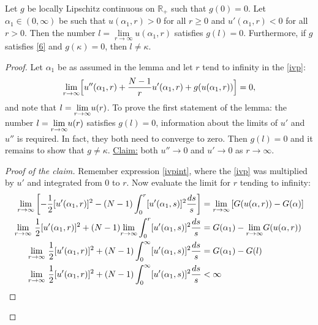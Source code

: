 \begin{lemma}\label{llemma}
Let $g$ be locally Lipschitz continuous on $\mathbb{R_+}$ such that $g(0)=0$. Let $\alpha_1\in(0,\infty)$ be such that $u(\alpha_1,r)>0$ for all $r\geq0$ and $u'(\alpha_1,r)<0$ for all $r>0$. Then the number $l=\underset{r\to\infty}{\lim}u(\alpha_1,r)$ satisfies $g(l)=0$. Furthermore, if $g$ satisfies \eqref{6} and $g(\kappa)=0$, then $l\neq\kappa$.
\end{lemma}
\begin{proof}
Let $\alpha_1$ be as assumed in the lemma and let $r$ tend to infinity in the \eqref{ivp}:
\begin{equation}\label{ivplim}\underset{r\to\infty}{\lim}\Big[u''(\alpha_1,r)+\frac{N-1}{r}u'(\alpha_1,r)+g(u(\alpha_1,r))\Big]=0,\end{equation} and note that $l=\underset{r\to\infty}{\lim} u(r)$. To prove the first statement of the lemma: the number $l=\underset{r\to\infty}{\lim} u(r)$ satisfies $g(l)=0$, information about the limits of $u'$ and $u''$ is required. In fact, they both need to converge to zero. Then $g(l)=0$ and it remains to show that $g\neq\kappa$. \underline{Claim:} both $u''\to0$ and $u'\to0$ as $r\to\infty.$
\begin{proof}[Proof of the claim] Remember expression \eqref{ivpint}, where the \eqref{ivp} was multiplied by $u'$ and integrated from 0 to $r$. Now evaluate the limit for $r$ tending to infinity:
\begin{align*}
	\underset{r\to\infty}{\lim}\left[-\frac{1}{2}[u'(\alpha_1,r)]^2-(N-1)\int_0^r[u'(\alpha_1,s)]^2\frac{ds}{s}\right]
        &=\limrtoinf\left[G(u(\alpha,r))-G(\alpha)\right] \\
    \underset{r\to\infty}{\lim}~\frac{1}{2}[u'(\alpha_1,r)]^2+(N-1)\underset{r\to\infty}{\lim}\int_0^r[u'(\alpha_1,s)]^2\frac{ds}{s}
        &=G(\alpha_1)-\underset{r\to\infty}{\lim}G(u(\alpha,r))\\
    \underset{r\to\infty}{\lim}~\frac{1}{2}[u'(\alpha_1,r)]^2+(N-1)\int_0^\infty[u'(\alpha_1,s)]^2\frac{ds}{s}
        &=G(\alpha_1)-G(l)\\
    \underset{r\to\infty}{\lim}~\frac{1}{2}[u'(\alpha_1,r)]^2+(N-1)\int_0^\infty[u'(\alpha_1,s)]^2\frac{ds}{s}
        &<\infty

\end{align*}
\end{proof}
\end{proof}
